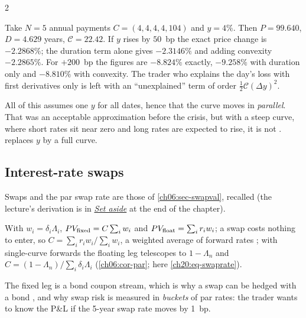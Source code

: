 \begin{paracol}{2}
\begin{example}\label{ch20:ex-bond}
Take $N=5$ annual payments $C=(4,4,4,4,104)$ and $y=4\%$. Then $P=99.640$, $D=4.629$ years, $\mathcal C=22.42$. If $y$ rises by $50$~bp the exact
price change is $-2.2868\%$; the duration term alone gives $-2.3146\%$ and adding convexity $-2.2865\%$. For $+200$~bp the figures are
$-8.824\%$ exactly, $-9.258\%$ with duration only and $-8.810\%$ with convexity. The trader who
explains the day's loss with first derivatives only  is left with an ``unexplained'' term
of order $\frac12\mathcal C(\Delta y)^2$.
\end{example}

All of this assumes one $y$ for all dates, hence that the curve moves in \emph{parallel}. That was an acceptable
approximation before the crisis, but with a steep curve, where short rates sit near zero and long rates are expected to
rise, it is not .  replaces $y$ by a full curve.

\subsection{Interest-rate swaps}\label{ch20:sec-swaps}
Swaps and the par swap rate are those of \cref{ch06:sec-swapval}, recalled \inmargin{} (the lecture's derivation is in \hyperref[ch20:sec-setaside]{\emph{Set aside}} at the end of the chapter).
\begin{recall}
With $w_i=\delta_i\Lambda_i$, $PV_{\rm fixed}=C\sum_iw_i$ and $PV_{\rm float}=\sum_ir_iw_i$; a swap costs nothing to enter, so $C=\sum_ir_iw_i/\sum_iw_i$, a weighted average of forward rates ; with single-curve forwards the floating leg telescopes to $1-\Lambda_n$ and $C=(1-\Lambda_n)/\sum_i\delta_i\Lambda_i$ (\cref{ch06:cor-par}; here \eqref{ch20:eq-swaprate}).
\end{recall} The fixed leg is a bond coupon stream, which is why a swap can be
hedged with a bond , and why swap risk is measured in \emph{buckets} of par rates: the trader wants to know
the P\&L if the 5-year swap rate moves by 1~bp.


\end{paracol}
